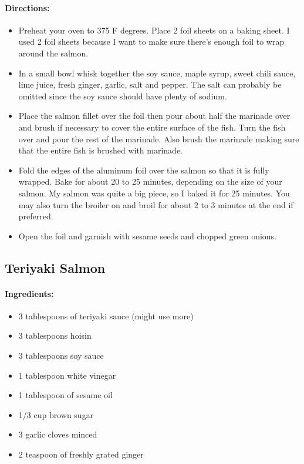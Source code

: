 \documentclass{article}
\begin{document}
\paragraph{Directions:}
\begin{itemize}
    \item Preheat your oven to 375 F degrees. Place 2 foil sheets on a baking sheet. I used 2 foil sheets because I want to make sure there’s enough foil to wrap around the salmon.
    \item In a small bowl whisk together the soy sauce, maple syrup, sweet chili sauce, lime juice, fresh ginger, garlic, salt and pepper. The salt can probably be omitted since the soy sauce should have plenty of sodium.
    \item Place the salmon fillet over the foil then pour about half the marinade over and brush if necessary to cover the entire surface of the fish. Turn the fish over and pour the rest of the marinade. Also brush the marinade making sure that the entire fish is brushed with marinade.
    \item Fold the edges of the aluminum foil over the salmon so that it is fully wrapped. Bake for about 20 to 25 minutes, depending on the size of your salmon. My salmon was quite a big piece, so I baked it for 25 minutes. You may also turn the broiler on and broil for about 2 to 3 minutes at the end if preferred.
    \item Open the foil and garnish with sesame seeds and chopped green onions.
\end{itemize}

\subsection{Teriyaki Salmon}

\paragraph{Ingredients:}
\begin{itemize}
    \item 3 tablespoons of teriyaki sauce (might use more)
    \item 3 tablespoons hoisin
    \item 3 tablespoons soy sauce
    \item 1 tablespoon white vinegar
    \item 1 tablespoon of sesame oil
    \item 1/3 cup brown sugar
    \item 3 garlic cloves minced
    \item 2 teaspoon of freshly grated ginger
\end{itemize}
\end{document}
